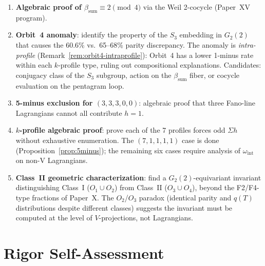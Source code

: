 \documentclass[11pt,a4paper]{article}
\theoremstyle{remark}
\begin{document}
\begin{enumerate}
  \item \textbf{Algebraic proof of $\beta_{\mathrm{sum}} \equiv 2 \pmod 4$}
        via the Weil 2-cocycle (Paper~XV program).

  \item \textbf{Orbit~4 anomaly}: identify the property of the $S_3$
        embedding in $G_2(2)$ that causes the 60.6\% vs.\ 65--68\% parity
        discrepancy.
        The anomaly is \emph{intra-profile} (Remark~\ref{rem:orbit4-intraprofile}):
        Orbit~4 has a lower 1-minus rate within each $k$-profile type,
        ruling out compositional explanations.
        Candidates: conjugacy class of the $S_3$ subgroup, action on the
        $\beta_{\mathrm{sum}}$ fiber, or cocycle evaluation on the pentagram loop.

  \item \textbf{5-minus exclusion for $(3,3,3,0,0)$}: algebraic proof that
        three Fano-line Lagrangians cannot all contribute $h=1$.

  \item \textbf{$k$-profile algebraic proof}: prove each of the 7 profiles
        forces odd $\Sigma h$ without exhaustive enumeration.
        The $(7,1,1,1,1)$ case is done (Proposition~\ref{prop:5minus});
        the remaining six cases require analysis of $\omega_{\mathrm{int}}$
        on non-V Lagrangians.

  \item \textbf{Class~II geometric characterization}: find a
        $G_2(2)$-equivariant invariant distinguishing Class~I
        ($O_1 \cup O_2$) from Class~II ($O_3 \cup O_4$), beyond the
        F2/F4-type fractions of Paper~X.
        The $O_2$/$O_3$ paradox (identical parity and $q(T)$ distributions
        despite different classes) suggests the invariant must be computed
        at the level of $V$-projections, not Lagrangians.
\end{enumerate}


\appendix
\setcounter{table}{5}
\renewcommand{\thetable}{A\arabic{table}}
\renewcommand{\theHtable}{A\arabic{table}}
\section{Rigor Self-Assessment}
\end{document}
